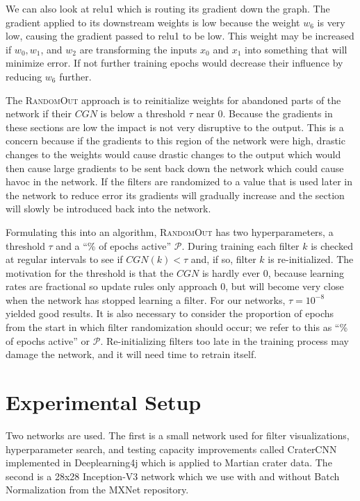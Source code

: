 \documentclass{article}
\begin{document}
We can also look at relu1 which is routing its gradient down the graph. The gradient applied to its downstream weights is low because the weight $w_6$ is very low, causing the gradient passed to relu1 to be low. This weight may be increased if $w_0, w_1$, and $w_2$ are transforming the inputs $x_0$ and $x_1$ into something that will minimize error. If not further training epochs would decrease their influence by reducing $w_6$ further. 

	 	 


The \textsc{RandomOut} approach is to reinitialize weights for abandoned parts of the network if their $CGN$ is below a threshold $\tau$ near 0. Because the gradients in these sections are low the impact is not very disruptive to the output. This is a concern because if the gradients to this region of the network were high, drastic changes to the weights would cause drastic changes to the output which would then cause large gradients to be sent back down the network which could cause havoc in the network. If the filters are randomized to a value that is used later in the network to reduce error its gradients will gradually increase and the section will slowly be introduced back into the network.
	

Formulating this into an algorithm, \textsc{RandomOut} has two hyperparameters, a threshold $\tau$ and a ``\% of epochs active'' $\mathcal{P}$. During training each filter $k$ is checked at regular intervals to see if $CGN(k) < \tau$ and, if so, filter $k$ is re-initialized. The motivation for the threshold is that the $CGN$ is hardly ever 0, because learning rates are fractional so update rules only approach 0, but will become very close when the network has stopped learning a filter. For our networks, $\tau = 10^{-8}$ yielded good results. It is also necessary to consider the proportion of epochs from the start in which filter randomization should occur; we refer to this as ``\% of epochs active'' or $\mathcal{P}$. Re-initializing filters too late in the training process may damage the network, and it will need time to retrain itself. 


	
\section{Experimental Setup}
\label{sec:expsetup}


Two networks are used. The first is a small network used for filter visualizations, hyperparameter search, and testing capacity improvements called CraterCNN \cite{cohen_crater_2016} implemented in Deeplearning4j \cite{deeplearning4j_development_team_deeplearning4j:_2015} which is applied to Martian crater data. The second is a 28x28 Inception-V3 network which we use with and without Batch Normalization \cite{chen_mxnet:_2015} \cite{szegedy_rethinking_2015} from the MXNet repository. 
\end{document}

